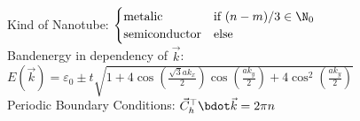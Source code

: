 \documentclass[fs, footer]{latex4ei}
\begin{document}
\begin{multicols}{4}
	Kind of Nanotube: $\begin{cases} \text{metalic} & \text{if}\ (n-m)/3 \in \N_0 \\ \text{semiconductor} & \text{else} \end{cases}$\\
	Bandenergy in dependency of $\vec k$: \\
	$E(\vec k) = \varepsilon_0 \pm t \sqrt{1+4\cos\left( \frac{\sqrt{3} a k_x}{2} \right)  \cos\left( \frac{ a k_y}{2} \right) + 4\cos^2\left( \frac{a k_y}{2} \right) }$\\
	Periodic Boundary Conditions: $\vec C^\top_h \bdot \vec k = 2 \pi n$\\
	

\end{multicols}

\end{document}
